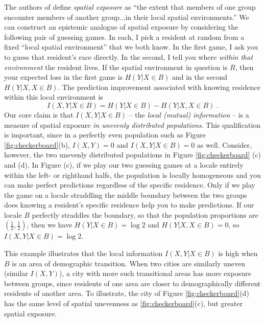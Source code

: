 \documentclass[english]{scrartcl}
\begin{document}
		The authors of \cite{Reardon2004} define \emph{spatial exposure} as ``the extent that members of one group encounter members of another group...in their local spatial environments.'' We can construct an epistemic analogue of spatial exposure by considering the following pair of guessing games. In each, I pick a resident at random from a fixed ``local spatial environment'' that we both know. In the first game, I ask you to guess that resident's race directly. In the second, I tell you where \emph{within that environment} the resident lives. If the spatial environment in question is $R$, then your expected loss in the first game is $H(Y|X\in B)$ and in the second $H(Y|X, X\in B)$. The prediction improvement associated with knowing residence within this local environment is 
		\begin{equation}
			I(X,Y | X \in B) = H(Y|X\in B) - H(Y|X, X\in B)\;.
		\end{equation}
		Our core claim is that $I(X,Y|X \in B)$ -- the \emph{local (mutual) information} -- is a measure of spatial exposure \emph{in unevenly distributed populations}. This qualification is important, since in a perfectly even population such as Figure \ref{fig:checkerboard}(b),  $I(X,Y) = 0$ and $I(X,Y|X\in B) = 0$ as well. Consider, however, the two unevenly distributed populations in Figure \ref{fig:checkerboard} (c) and (d). In Figure (c), if we play our two guessing games at a locale entirely within the left- or righthand halfs, the population is locally homogeneous and you can make perfect predictions regardless of the specific residence. Only if we play the game on a locale straddling the middle boundary between the two groups does knowing a resident's specific residence help you to make predictions. If our locale $B$ perfectly straddles the boundary, so that the population proportions are $(\frac{1}{2},\frac{1}{2})$, then we have $H(Y|X\in B) = \log 2$ and $H(Y|X,X\in B) = 0$, so $I(X,Y|X \in B) = \log 2$. 

		This example illustrates that the local information $I(X,Y|X\in B)$ is high when $B$ is an area of demographic transition. When two cities are similarly uneven (similar $I(X,Y)$), a city with more such transitional areas has more exposure between groups, since residents of one area are closer to demographically different residents of another area. To illustrate, the city of Figure \ref{fig:checkerboard}(d) has the same level of spatial unevenness as \ref{fig:checkerboard}(c), but greater spatial exposure. 
\end{document}
